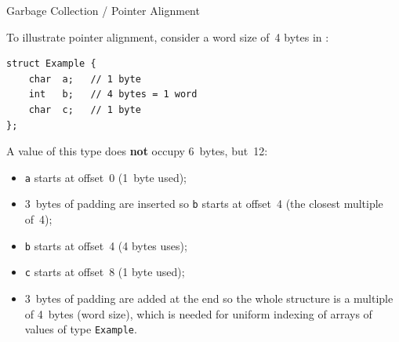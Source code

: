 \documentclass[compress,dvipdfmx]{beamer}
\begin{document}
%
\begin{frame}[fragile]{Garbage Collection / Pointer Alignment}

  To illustrate pointer alignment, consider a word size of~4 bytes in
  \C:
\begin{verbatim}
struct Example {
    char  a;   // 1 byte
    int   b;   // 4 bytes = 1 word
    char  c;   // 1 byte
};
\end{verbatim}
A value of this type does \textbf{not} occupy 6~bytes, but~12:
\begin{itemize}

  \item \texttt{a} starts at offset~0 (1~byte used);

  \item 3~bytes of padding are inserted so \texttt{b} starts at
    offset~4 (the closest multiple of~4);

  \item \texttt{b} starts at offset~4 (4 bytes uses);

  \item \texttt{c} starts at offset~8 (1 byte used);

  \item 3~bytes of padding are added at the end so the whole structure
    is a multiple of 4~bytes (word size), which is needed for uniform
    indexing of arrays of values of type \texttt{Example}.

\end{itemize}

\end{frame}
\end{document}
